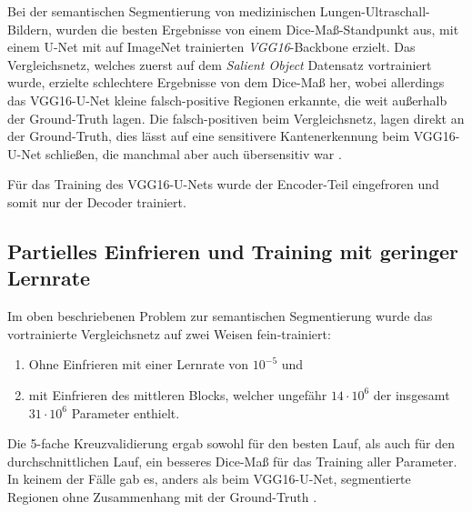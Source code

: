 Bei der semantischen Segmentierung von medizinischen Lungen-Ultraschall-Bildern, wurden die besten Ergebnisse von einem Dice-Maß-Standpunkt aus, 
mit einem U-Net mit auf ImageNet trainierten \textit{VGG16}-Backbone erzielt. Das Vergleichsnetz, welches zuerst auf dem \textit{Salient Object}
Datensatz vortrainiert wurde, erzielte schlechtere Ergebnisse von dem Dice-Maß her, wobei allerdings das VGG16-U-Net kleine falsch-positive 
Regionen erkannte, die weit außerhalb der Ground-Truth lagen. Die falsch-positiven beim Vergleichsnetz, lagen direkt an der Ground-Truth, 
dies lässt auf eine sensitivere Kantenerkennung beim VGG16-U-Net schließen, die manchmal aber auch übersensitiv war \cite{Cheng.05.10.2021}. 

Für das Training des VGG16-U-Nets wurde der Encoder-Teil eingefroren und somit nur der Decoder trainiert. 

\subsection{Partielles Einfrieren und Training mit geringer Lernrate}

Im oben beschriebenen Problem zur semantischen Segmentierung wurde das vortrainierte Vergleichsnetz auf zwei Weisen fein-trainiert:
\begin{enumerate}
	\item Ohne Einfrieren mit einer Lernrate von $10^{-5}$ und
	\item mit Einfrieren des mittleren Blocks, welcher ungefähr $14\cdot 10^6$ der insgesamt $31 \cdot 10^6$ Parameter enthielt. 
\end{enumerate}
Die 5-fache Kreuzvalidierung ergab sowohl für den besten Lauf, als auch für den durchschnittlichen Lauf, ein besseres Dice-Maß 
für das Training aller Parameter. In keinem der Fälle gab es, anders als beim VGG16-U-Net, segmentierte Regionen ohne Zusammenhang mit der Ground-Truth \cite{Cheng.05.10.2021}. 

